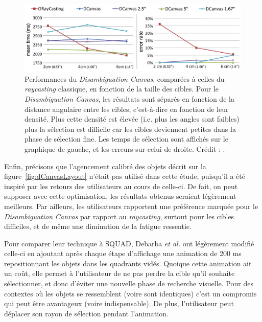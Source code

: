 	\begin{figure}[H]
		\centering
		\includegraphics[width=\textwidth]{figures/ch2/dCanvasRCPerf}
		\caption[\emph{Disambiguation Canvas} -- performances I]{Performances du \emph{Disambiguation Canvas}, comparées à celles du \emph{raycasting} classique, en fonction de la taille des cibles. Pour le \emph{Disambiguation Canvas}, les résultats sont séparés en fonction de la distance angulaire entre les cibles, c'est-à-dire en fonction de leur densité. Plus cette densité est élevée (i.e. plus les angles sont faibles) plus la sélection est difficile car les cibles deviennent petites dans la phase de sélection fine. Les temps de sélection sont affichés sur le graphique de gauche, et les erreurs sur celui de droite. Crédit : \cite{debarba2013disambiguation}.}
		\label{fig:dCanvasRCPerf}
	\end{figure}

	Enfin, précisons que l'agencement calibré des objets décrit sur la figure~\ref{fig:dCanvasLayout} n'était pas utilisé dans cette étude, puisqu'il a été inspiré par les retours des utilisateurs au cours de celle-ci. De fait, on peut supposer avec cette optimisation, les résultats obtenus seraient légèrement meilleurs. Par ailleurs, les utilisateurs rapportent une préférence marquée pour le \emph{Disambiguation Canvas} par rapport au \emph{raycasting}, surtout pour les cibles difficiles, et de même une diminution de la fatigue ressentie.
	
	Pour comparer leur technique à SQUAD, Debarba \emph{et al.} ont légèrement modifié celle-ci en ajoutant après chaque étape \og d'affichage \fg{} une animation de 200 ms repositionnant les objets dans les quadrants vidés. Quoique cette animation ait un coût, elle permet à l'utilisateur de ne pas perdre la cible qu'il souhaite sélectionner, et donc d'éviter une nouvelle phase de recherche visuelle. Pour des contextes où les objets se ressemblent (voire sont identiques) c'est un compromis qui peut être avantageux (voire indispensable). De plus, l'utilisateur peut déplacer son rayon de sélection pendant l'animation.
	
